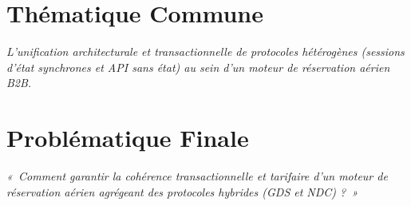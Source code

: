 \documentclass[11pt,a4paper]{article}
\begin{document}
\section{Thématique Commune}
\noindent\textit{L'unification architecturale et transactionnelle de protocoles hétérogènes (sessions d'état synchrones et API sans état) au sein d'un moteur de réservation aérien B2B.}

\section{Problématique Finale}
\begin{tcolorbox}[colback=LightGray, colframe=NavyBlue, arc=4pt, boxrule=1.2pt]
\centering\large\itshape\color{NavyBlue}
«~Comment garantir la cohérence transactionnelle et tarifaire d'un moteur de réservation aérien agrégeant des protocoles hybrides (GDS et NDC) ?~»
\end{tcolorbox}
\end{document}
